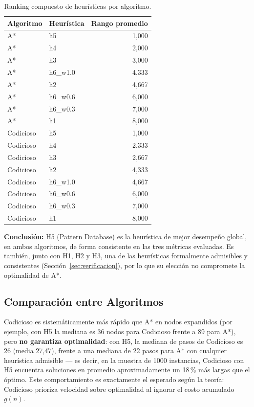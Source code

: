 \documentclass[11pt]{article}
\begin{document}
\begin{table}[H]
\centering
\caption{Ranking compuesto de heurísticas por algoritmo.}
\begin{tabular}{llr}
\toprule
Algoritmo & Heurística & Rango promedio \\
\midrule
A* & h5 & 1,000 \\
A* & h4 & 2,000 \\
A* & h3 & 3,000 \\
A* & h6\_w1.0 & 4,333 \\
A* & h2 & 4,667 \\
A* & h6\_w0.6 & 6,000 \\
A* & h6\_w0.3 & 7,000 \\
A* & h1 & 8,000 \\
\midrule
Codicioso & h5 & 1,000 \\
Codicioso & h4 & 2,333 \\
Codicioso & h3 & 2,667 \\
Codicioso & h2 & 4,333 \\
Codicioso & h6\_w1.0 & 4,667 \\
Codicioso & h6\_w0.6 & 6,000 \\
Codicioso & h6\_w0.3 & 7,000 \\
Codicioso & h1 & 8,000 \\
\bottomrule
\end{tabular}
\end{table}

\noindent
\textbf{Conclusión:} H5 (Pattern Database) es la heurística de mejor
desempeño global, en ambos algoritmos, de forma consistente en las tres
métricas evaluadas. Es también, junto con H1, H2 y H3, una de las heurísticas
formalmente admisibles y consistentes (Sección~\ref{sec:verificacion}), por
lo que su elección no compromete la optimalidad de A*.

\subsection{Comparación entre Algoritmos}
Codicioso es sistemáticamente más rápido que A* en nodos expandidos (por
ejemplo, con H5 la mediana es 36 nodos para Codicioso frente a 89 para A*),
pero \textbf{no garantiza optimalidad}: con H5, la mediana de pasos de
Codicioso es 26 (media 27,47), frente a una mediana de 22 pasos para A* con
cualquier heurística admisible --- es decir, en la muestra de 1000
instancias, Codicioso con H5 encuentra soluciones en promedio
aproximadamente un 18\,\% más largas que el óptimo. Este comportamiento es
exactamente el esperado según la teoría: Codicioso prioriza velocidad sobre
optimalidad al ignorar el costo acumulado $g(n)$.
\end{document}
